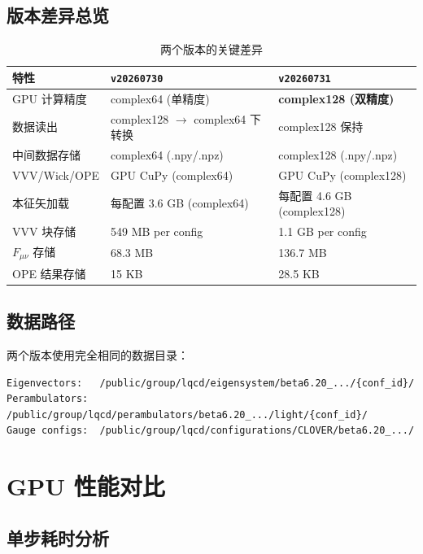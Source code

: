 \documentclass[12pt,a4paper]{ctexart}
\begin{document}
\subsection{版本差异总览}

\begin{table}[H]
\centering
\caption{两个版本的关键差异}
\begin{tabular}{p{3.5cm}ll}
\toprule
特性 & \texttt{v20260730} & \texttt{v20260731} \\
\midrule
GPU 计算精度 & complex64 (单精度) & \textbf{complex128 (双精度)} \\
数据读出 & complex128 $\to$ complex64 下转换 & complex128 保持 \\
中间数据存储 & complex64 (.npy/.npz) & complex128 (.npy/.npz) \\
VVV/Wick/OPE & GPU CuPy (complex64) & GPU CuPy (complex128) \\
本征矢加载 & 每配置 3.6 GB (complex64) & 每配置 4.6 GB (complex128) \\
VVV 块存储 & 549 MB per config & 1.1 GB per config \\
$F_{\mu\nu}$ 存储 & 68.3 MB & 136.7 MB \\
OPE 结果存储 & 15 KB & 28.5 KB \\
\bottomrule
\end{tabular}
\end{table}

\subsection{数据路径}

两个版本使用完全相同的数据目录：
\begin{verbatim}
Eigenvectors:   /public/group/lqcd/eigensystem/beta6.20_.../{conf_id}/
Perambulators:  /public/group/lqcd/perambulators/beta6.20_.../light/{conf_id}/
Gauge configs:  /public/group/lqcd/configurations/CLOVER/beta6.20_.../
\end{verbatim}

\section{GPU 性能对比}

\subsection{单步耗时分析}
\end{document}
